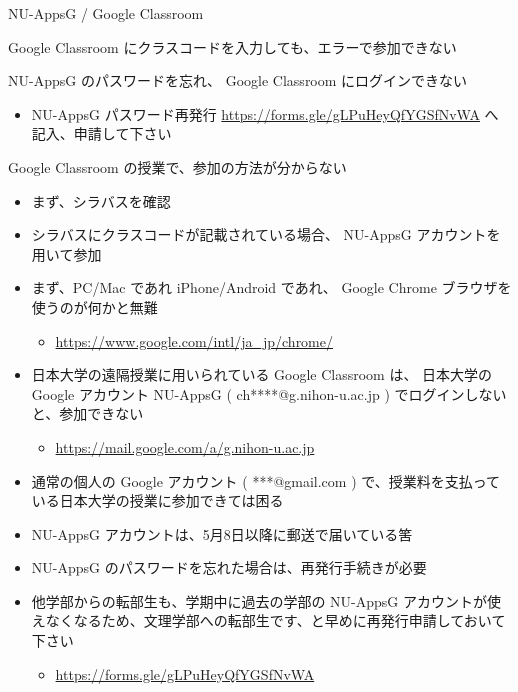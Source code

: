 \documentclass[a4j,10pt]{jsarticle}
\begin{document}
{\begin{frame}[label={sec:orgbe869cf},fragile]{NU-AppsG / Google Classroom}
\begin{block}{Google Classroom にクラスコードを入力しても、エラーで参加できない}
\begin{itemize}
\end{itemize}
\end{block}
\par
\begin{block}{NU-AppsG のパスワードを忘れ、 Google Classroom にログインできない}
\begin{itemize}
\item NU-AppsG パスワード再発行
\url{https://forms.gle/gLPuHeyQfYGSfNvWA}
へ記入、申請して下さい
\end{itemize}
\end{block}
\par
\begin{block}{Google Classroom の授業で、参加の方法が分からない}
\begin{itemize}
\item まず、シラバスを確認
\item シラバスにクラスコードが記載されている場合、 NU-AppsG アカウントを用いて参加
\par
\item まず、PC/Mac であれ iPhone/Android であれ、 Google Chrome ブラウザを使うのが何かと無難
\begin{itemize}
\item \url{https://www.google.com/intl/ja\_jp/chrome/}
\end{itemize}
\par
\item 日本大学の遠隔授業に用いられている Google Classroom は、
日本大学の Google アカウント NU-AppsG ( ch****@g.nihon-u.ac.jp ) でログインしないと、参加できない
\begin{itemize}
\item \url{https://mail.google.com/a/g.nihon-u.ac.jp}
\end{itemize}
\par
\item 通常の個人の Google アカウント ( ***@gmail.com ) で、授業料を支払っている日本大学の授業に参加できては困る
\item NU-AppsG アカウントは、5月8日以降に郵送で届いている筈
\par
\item NU-AppsG のパスワードを忘れた場合は、再発行手続きが必要
\item 他学部からの転部生も、学期中に過去の学部の NU-AppsG アカウントが使えなくなるため、文理学部への転部生です、と早めに再発行申請しておいて下さい
\begin{itemize}
\item \url{https://forms.gle/gLPuHeyQfYGSfNvWA}
\end{itemize}

\end{itemize}
\end{block}
\end{frame}}
\end{document}
